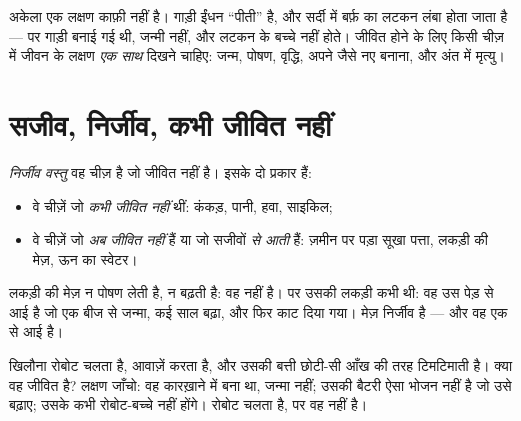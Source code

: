 \begin{remark}[हर लक्षण मायने रखता है]\label{rem:g1:living-or-not:allsigns}
अकेला एक लक्षण काफ़ी नहीं है। गाड़ी ईंधन ``पीती'' है, और सर्दी में
बर्फ़ का लटकन लंबा होता जाता है --- पर गाड़ी बनाई गई थी, जन्मी नहीं,
और लटकन के बच्चे नहीं होते। जीवित होने के लिए किसी चीज़ में जीवन के
लक्षण \emph{एक साथ} दिखने चाहिए: जन्म, पोषण, वृद्धि, अपने जैसे नए
 बनाना, और अंत में मृत्यु।
\end{remark}

\section{सजीव, निर्जीव, कभी जीवित नहीं}

\begin{definition}[निर्जीव वस्तु]\label{def:g1:living-or-not:nonliving}
\emph{निर्जीव वस्तु} वह चीज़ है जो जीवित नहीं
है। इसके दो प्रकार हैं:
\begin{itemize}
  \item वे चीज़ें जो \emph{कभी जीवित नहीं} थीं:
        कंकड़, पानी, हवा, साइकिल;
  \item वे चीज़ें जो \emph{अब जीवित नहीं}
हैं या जो सजीवों \emph{से आती} हैं: ज़मीन पर पड़ा सूखा
        पत्ता, लकड़ी की मेज़, ऊन का स्वेटर।
\end{itemize}
\end{definition}

\begin{example}[लकड़ी की मेज़]\label{ex:g1:living-or-not:table}
लकड़ी की मेज़ न पोषण लेती है, न बढ़ती है: वह  नहीं है। पर उसकी
लकड़ी कभी  थी: वह उस पेड़ से आई है जो एक बीज से जन्मा, कई साल
बढ़ा, और फिर काट दिया गया। मेज़ निर्जीव है --- और वह एक  से आई
है।
\end{example}

\begin{example}[रोबोट का क्या?]\label{ex:g1:living-or-not:robot}
खिलौना रोबोट चलता है, आवाज़ें करता है, और उसकी बत्ती छोटी-सी आँख की
तरह टिमटिमाती है। क्या वह जीवित है? लक्षण जाँचो: वह कारख़ाने में बना
था, जन्मा नहीं; उसकी बैटरी ऐसा भोजन नहीं है जो उसे बढ़ाए; उसके कभी
रोबोट-बच्चे नहीं होंगे। रोबोट चलता है, पर वह  नहीं है।
\end{example}

